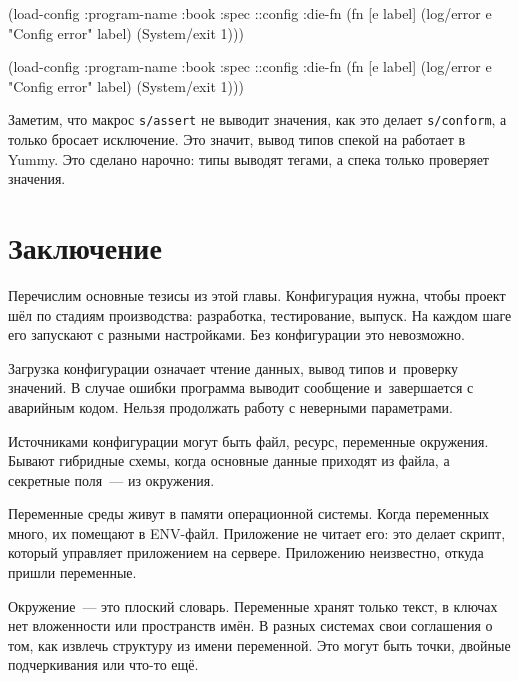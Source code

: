 \ifnarrow

\begin{english}
  \begin{clojure}
(load-config
 {:program-name :book
  :spec ::config
  :die-fn (fn [e label]
            (log/error e
              "Config error" label)
            (System/exit 1))})
  \end{clojure}
\end{english}

\else

\begin{english}
  \begin{clojure}
(load-config
 {:program-name :book
  :spec ::config
  :die-fn (fn [e label]
            (log/error e "Config error" label)
            (System/exit 1))})
  \end{clojure}
\end{english}

\fi

Заметим, что макрос \verb|s/assert| не выводит значения, как это делает
\verb|s/conform|, а только бросает исключение. Это значит, вывод типов спекой на
работает в Yummy. Это сделано нарочно: типы выводят тегами, а спека только
проверяет значения.

\section{Заключение}

Перечислим основные тезисы из этой главы. Конфигурация нужна, чтобы проект шёл
по стадиям производства: разработка, тестирование, выпуск. На каждом шаге его
запускают с разными настройками. Без конфигурации это невозможно.

Загрузка конфигурации означает чтение данных, вывод типов и~проверку значений. В
случае ошибки программа выводит сообщение и~завершается с аварийным
кодом. Нельзя продолжать работу с неверными параметрами.

Источниками конфигурации могут быть файл, ресурс, переменные окружения. Бывают
гибридные схемы, когда основные данные приходят из файла, а секретные поля~--- из
окружения.

Переменные среды живут в памяти операционной системы. Когда переменных много, их
помещают в ENV-файл. Приложение не читает его: это делает скрипт, который
управляет приложением на сервере. Приложению неизвестно, откуда пришли
переменные.

Окружение~--- это плоский словарь. Переменные хранят только текст, в ключах нет
вложенности или пространств имён. В разных системах свои соглашения о том, как
извлечь структуру из имени переменной. Это могут быть точки, двойные
подчеркивания или что-то ещё.

